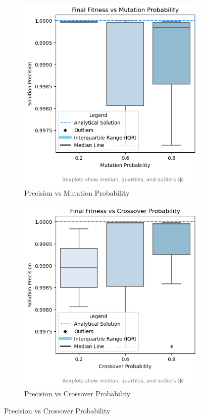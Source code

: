 \documentclass[11pt,a4paper,twoside]{article}
\begin{document}
\begin{figure}[H]
    \centering
    \begin{subfigure}[b]{0.35\textwidth}
        \centering
        \includegraphics[width=\textwidth]{mutation.png}
        \caption{Precision vs Mutation Probability}
        \label{fig:mutation}
    \end{subfigure}
    \hfill
    \begin{subfigure}[b]{0.35\textwidth}
        \centering
        \includegraphics[width=\textwidth]{crossover.png}
        \caption{Precision vs Crossover Probability}
        \label{fig:crossover}
    \end{subfigure}
\end{figure}
\end{document}
